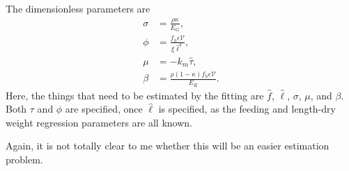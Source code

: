 \documentclass[12pt,reqno,final,pdftex]{amsart}\usepackage[]{graphicx}\usepackage[]{color}
\theoremstyle{plain}
\numberwithin{equation}{part}
\begin{document}
The dimensionless parameters are
\begin{align}
\sigma &= \frac{\rho \kappa}{E_G}, \\
\phi &= \frac{f_h \epsilon \mathcal{V}}{\xi \hat{\ell}^q}, \\
\mu &= -k_m \hat{\tau}, \\
\beta &= \frac{\rho (1-\kappa) f_h \epsilon \mathcal{V}}{E_R}.
\end{align}
Here, the things that need to be estimated by the fitting are $\hat{f}$, $\hat{\ell}$, $\sigma$, $\mu$, and $\beta$.
Both $\tau$ and $\phi$ are specified, once $\hat{\ell}$ is specified, as the feeding and length-dry weight regression parameters are all known.

Again, it is not totally clear to me whether this will be an easier estimation problem.
\end{document}
